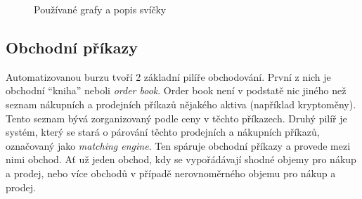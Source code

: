 \begin{figure}[ht]
    \centering
    \qquad

    \qquad

    \caption{Používané grafy a popis svíčky}
    \label{fig:most-used-charts}
\end{figure}


\subsection{Obchodní příkazy}
\label{subsec:market-trade-orders}
Automatizovanou burzu tvoří 2 základní pilíře obchodování. První z nich je obchodní \enquote{kniha} neboli \emph{order book}. Order book není v podstatě nic
jiného než seznam nákupních a prodejních příkazů nějakého aktiva (například kryptoměny). Tento seznam bývá zorganizovaný podle ceny v těchto příkazech.
Druhý pilíř je systém, který se stará o párování těchto prodejních a nákupních příkazů, označovaný jako \emph{matching engine}. Ten spáruje obchodní příkazy
a provede mezi nimi obchod. Ať už jeden obchod, kdy se vypořádávají shodné objemy pro nákup a prodej, nebo více obchodů v případě nerovnoměrného objemu pro nákup a prodej.

